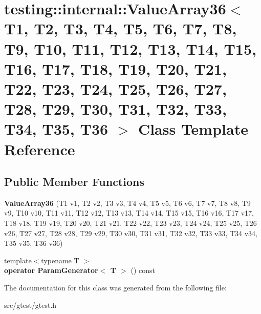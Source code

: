 \hypertarget{classtesting_1_1internal_1_1_value_array36}{}\section{testing\+:\+:internal\+:\+:Value\+Array36$<$ T1, T2, T3, T4, T5, T6, T7, T8, T9, T10, T11, T12, T13, T14, T15, T16, T17, T18, T19, T20, T21, T22, T23, T24, T25, T26, T27, T28, T29, T30, T31, T32, T33, T34, T35, T36 $>$ Class Template Reference}
\label{classtesting_1_1internal_1_1_value_array36}
\subsection*{Public Member Functions}
\begin{DoxyCompactItemize}
\item 
\mbox{\label{classtesting_1_1internal_1_1_value_array36_ab8c5d6f3e523dd0926b664ae0c34e30b}} 
{\bfseries Value\+Array36} (T1 v1, T2 v2, T3 v3, T4 v4, T5 v5, T6 v6, T7 v7, T8 v8, T9 v9, T10 v10, T11 v11, T12 v12, T13 v13, T14 v14, T15 v15, T16 v16, T17 v17, T18 v18, T19 v19, T20 v20, T21 v21, T22 v22, T23 v23, T24 v24, T25 v25, T26 v26, T27 v27, T28 v28, T29 v29, T30 v30, T31 v31, T32 v32, T33 v33, T34 v34, T35 v35, T36 v36)
\item 
\mbox{\label{classtesting_1_1internal_1_1_value_array36_ae47fff761f51a81079671c58fd2c2ae2}} 
{\footnotesize template$<$typename T $>$ }\\{\bfseries operator Param\+Generator$<$ T $>$} () const
\end{DoxyCompactItemize}


The documentation for this class was generated from the following file\+:\begin{DoxyCompactItemize}
\item 
src/gtest/gtest.\+h\end{DoxyCompactItemize}
